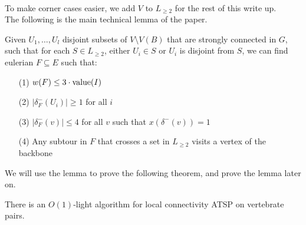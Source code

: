 \documentclass[./main.tex]{subfiles}
\begin{document}
\\To make corner cases easier, we add $V$ to $L_{\geq 2}$ for the rest of this write up.\vspace{2mm}
\\The following is the main technical lemma of the paper. \vspace{1mm}
\begin{lemma}\label{lemma7}
Given $U_1,\ldots,U_l$ disjoint subsets of $V\setminus V(B)$ that are strongly connected in $G$, such that for each $S\in L_{\geq 2}$, either $U_i\in S$ or $U_i$ is disjoint from $S$, we can find eulerian $F\subseteq E$ such that:
\begin{enumerate}
\item[(1)] $w(F)\leq 3\cdot \textup{value}(I)$
\item[(2)] $|\delta^-_F(U_i)|\geq 1$ for all $i$
\item[(3)] $|\delta^-_F(v)|\leq 4$ for all $v$ such that $x(\delta^-(v)) = 1$
\item[(4)] Any subtour in $F$ that crosses a set in $L_{\geq 2}$ visits a vertex of the backbone
\end{enumerate}
\end{lemma}\vspace{2mm}
We will use the lemma to prove the following theorem, and prove the lemma later on.\vspace{2mm}\pagebreak[2]
\begin{theorem}
There is an $O(1)$-light algorithm for local connectivity ATSP on vertebrate pairs.
\end{theorem}
\end{document}
